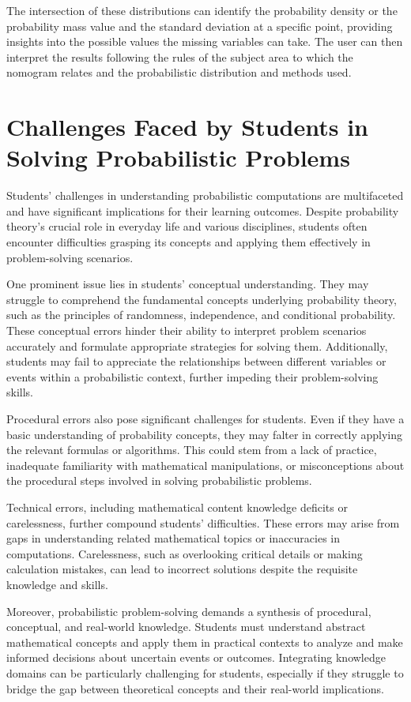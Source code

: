 \documentclass{l4proj}
\begin{document}
The intersection of these distributions can identify the probability density or the probability mass value and the standard deviation at a specific point, providing insights into the possible values the missing variables can take. The user can then interpret the results following the rules of the subject area to which the nomogram relates and the probabilistic distribution and methods used.   

\section{Challenges Faced by Students in Solving Probabilistic Problems}
Students' challenges in understanding probabilistic computations are multifaceted and have significant implications for their learning outcomes. Despite probability theory's crucial role in everyday life and various disciplines, students often encounter difficulties grasping its concepts and applying them effectively in problem-solving scenarios. \citep{arum_students_2018}

One prominent issue lies in students' conceptual understanding. They may struggle to comprehend the fundamental concepts underlying probability theory, such as the principles of randomness, independence, and conditional probability. These conceptual errors hinder their ability to interpret problem scenarios accurately and formulate appropriate strategies for solving them. Additionally, students may fail to appreciate the relationships between different variables or events within a probabilistic context, further impeding their problem-solving skills.

Procedural errors also pose significant challenges for students. Even if they have a basic understanding of probability concepts, they may falter in correctly applying the relevant formulas or algorithms. This could stem from a lack of practice, inadequate familiarity with mathematical manipulations, or misconceptions about the procedural steps involved in solving probabilistic problems.

Technical errors, including mathematical content knowledge deficits or carelessness, further compound students' difficulties. These errors may arise from gaps in understanding related mathematical topics or inaccuracies in computations. Carelessness, such as overlooking critical details or making calculation mistakes, can lead to incorrect solutions despite the requisite knowledge and skills.

Moreover, probabilistic problem-solving demands a synthesis of procedural, conceptual, and real-world knowledge. Students must understand abstract mathematical concepts and apply them in practical contexts to analyze and make informed decisions about uncertain events or outcomes. Integrating knowledge domains can be particularly challenging for students, especially if they struggle to bridge the gap between theoretical concepts and their real-world implications.
\end{document}
